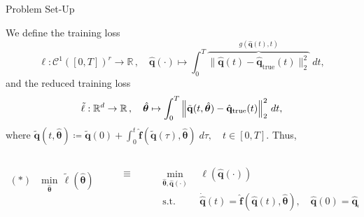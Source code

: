 \begin{frame}{Problem Set-Up}

We define the \textcolor{codeblue}{training loss} 
\vspace{-0.6cm}
\begin{equation*}
        \ell: \mathcal{C}^1([0,T])^r  \to \mathbb{R}\,,\quad \hat{\mathbf{q}}(\cdot) \mapsto  \int_0^T \overbrace{\Big\|\hat{\mathbf{q}}(t) - \hat{\mathbf{q}}_\mathrm{true}(t)\Big\|_2^2}^{g(\hat{\mathbf{q}}(t),t)}~dt,
        \label{eq:continuous_loss}
\end{equation*}
and the \textcolor{codeblue}{reduced training loss}
\begin{equation*}
        \tilde{\ell}: \mathbb{R}^d  \to \mathbb{R}\,,\quad \hat{\bm{\theta}} \mapsto \int_0^T \norm{\tilde{\mathbf{q}}(t,\hat{\bm{\theta}}) - \hat{\mathbf{q}}_\mathrm{true}(t)}_2^2~dt,
        \label{eq:continuous_reduced_loss}
    \end{equation*}
    where $\tilde{\mathbf{q}}(t, \hat{\bm{\theta}}) \coloneqq \tilde{\mathbf{q}}(0) + \displaystyle\int_{0}^t \hat{\mathbf{f}}(\tilde{\mathbf{q}}(\tau),\hat{\bm{\theta}})\;d\tau, \quad t\in[0,T]$. Thus,

\begin{columns}[T]
\begin{column}{0.1\textwidth}
\begin{align*}
    ~&~\\
    \bm{(*)}\quad\underset{\hat{\bm{\theta}}}{\mathrm{min}}~~\tilde\ell (\hat{\bm{\theta}})
\end{align*}
\end{column}

\begin{column}{0.03\textwidth}
\begin{align*}
    ~&~\\
    \bm{\equiv}
\end{align*}
\end{column}

\begin{column}{0.4\textwidth}
\begin{align*}
    \underset{\hat{\bm{\theta}},\hat{\mathbf{q}}(\cdot)}{\mathrm{min}} ~~&\ell (\hat{\mathbf{q}}(\cdot))\\
    \mathrm{s.t.}~~&\dot{\hat{\mathbf{q}}}(t) = \hat{\mathbf{f}}(\hat{\mathbf{q}}(t),\hat{\bm{\theta}}), \quad\hat{\mathbf{q}}(0)=\hat{\mathbf{q}}_0
    \label{eq:opt_problem}
\end{align*}
\end{column}
\end{columns}

\end{frame}


